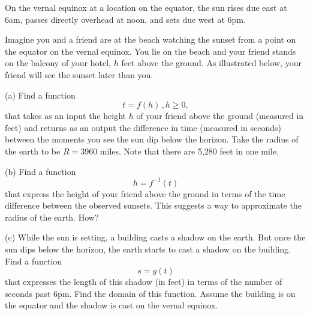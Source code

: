 \documentclass{ximera}
\begin{document}
\begin{question} \label{Q6:RightTriangle}
On the vernal equinox at a location on the equator, the sun rises due east at 6am, passes directly overhead at noon, and sets due west at 6pm. 

Imagine you and a friend are at the beach watching the sunset from a point on the equator on the vernal equinox. You lie on the beach and your friend stands on the balcony of your hotel, $h$ feet above the ground. As illustrated below, your friend will see the sunset later than you. 

(a) Find a function
\[
   t = f(h) \, , h\geq 0 ,
\]
that takes as an input the height $h$ of your friend above the ground (measured in feet) and returns as an output the difference in time (measured in seconds) between the moments you see the sun dip below the horizon. Take the radius of the earth to be $R=3960$ miles. Note that there are 5,280 feet in one mile.

(b) Find a function 
\[
   h = f^{-1}(t)
\]
that express the height of your friend above the ground in terms of the time difference between the observed sunsets. This suggests a way to approximate the radius of the earth. How?

(c) While the sun is setting, a building casts a shadow on the earth. But once the sun dips below the horizon, the earth starts to cast a shadow on the building. Find a function
\[
  s = g(t) 
\]
that expresses the length of this shadow (in feet) in terms of the number of seconds past 6pm. Find the domain of this function. Assume the building is on the equator and the shadow is cast on the vernal equinox.
\begin{exploration}

 
\begin{onlineOnly}
    \begin{center}
\end{center}
\end{onlineOnly}
\end{exploration}


\end{question}
\end{document}
